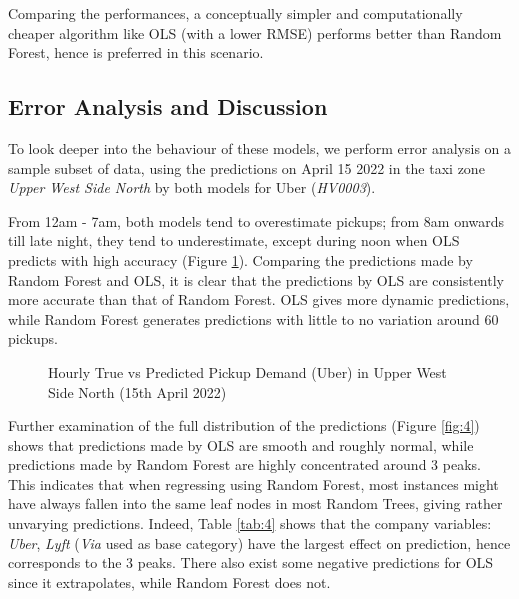 \documentclass[11pt]{article}
\begin{document}
Comparing the performances, a conceptually simpler and computationally cheaper algorithm like OLS (with a lower RMSE) performs better than Random Forest, hence is preferred in this scenario.



\subsection{Error Analysis and Discussion}
To look deeper into the behaviour of these models, we perform error analysis on a sample subset of data, using the predictions on April 15 2022 in the taxi zone \textit{Upper West Side North} by both models for Uber (\textit{HV0003}).

From 12am - 7am, both models tend to overestimate pickups; from 8am onwards till late night, they tend to underestimate, except during noon when OLS predicts with high accuracy (Figure \ref{fig:3}). Comparing the predictions made by Random Forest and OLS, it is clear that the predictions by OLS are consistently more accurate than that of Random Forest. OLS gives more dynamic predictions, while Random Forest generates predictions with little to no variation around 60 pickups. 

\begin{figure}[h]
    \centering
    \caption{Hourly True vs Predicted Pickup Demand (Uber) in Upper West Side North (15th April 2022)}
    \label{fig:3}
\end{figure}

Further examination of the full distribution of the predictions (Figure \ref{fig:4}) shows that predictions made by OLS are smooth and roughly normal, while predictions made by Random Forest are highly concentrated around 3 peaks. This indicates that when regressing using Random Forest, most instances might have always fallen into the same leaf nodes in most Random Trees, giving rather unvarying predictions. Indeed, Table \ref{tab:4} shows that the company variables: \textit{Uber}, \textit{Lyft} (\textit{Via} used as base category) have the largest effect on prediction, hence corresponds to the 3 peaks. There also exist some negative predictions for OLS since it extrapolates, while Random Forest does not.
\end{document}
